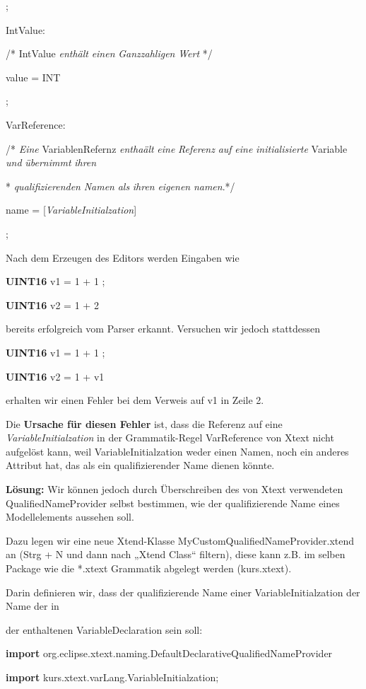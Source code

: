 \documentclass[]{article}
\begin{document}
;

IntValue:

/* IntValue \emph{enthält} \emph{einen} \emph{Ganzzahligen} \emph{Wert}
*/

value = INT

;

VarReference:

/* \emph{Eine} VariablenRefernz \emph{enthaält} \emph{eine}
\emph{Referenz} \emph{auf} \emph{eine} \emph{initialisierte} Variable
\emph{und} \emph{übernimmt} \emph{ihren}

* \emph{qualifizierenden} \emph{Namen} \emph{als} \emph{ihren}
\emph{eigenen} \emph{namen}.*/

name = {[}\emph{VariableInitialzation}{]}

;

Nach dem Erzeugen des Editors werden Eingaben wie

\textbf{UINT16} v1 = 1 + 1 ;

\textbf{UINT16} v2 = 1 + 2

bereits erfolgreich vom Parser erkannt. Versuchen wir jedoch stattdessen

\textbf{UINT16} v1 = 1 + 1 ;

\textbf{UINT16} v2 = 1 + v1

erhalten wir einen Fehler bei dem Verweis auf v1 in Zeile 2.

Die \textbf{Ursache für diesen Fehler }ist, dass die Referenz auf eine
\emph{VariableInitialzation} in der Grammatik-Regel VarReference von
Xtext nicht aufgelöst kann, weil VariableInitialzation weder einen
Namen, noch ein anderes Attribut hat, das als ein qualifizierender Name
dienen könnte.

\textbf{Lösung: }Wir können jedoch durch Überschreiben des von Xtext
verwendeten QualifiedNameProvider selbst bestimmen, wie der
qualifizierende Name eines Modellelements aussehen soll.

Dazu legen wir eine neue Xtend-Klasse
MyCustomQualifiedNameProvider.xtend an (Strg + N und dann nach „Xtend
Class`` filtern), diese kann z.B. im selben Package wie die *.xtext
Grammatik abgelegt werden (kurs.xtext).

Darin definieren wir, dass der qualifizierende Name einer
VariableInitialzation der Name der in

der enthaltenen VariableDeclaration sein soll:

\textbf{import}
org.eclipse.xtext.naming.DefaultDeclarativeQualifiedNameProvider

\textbf{import} kurs.xtext.varLang.VariableInitialzation;
\end{document}

